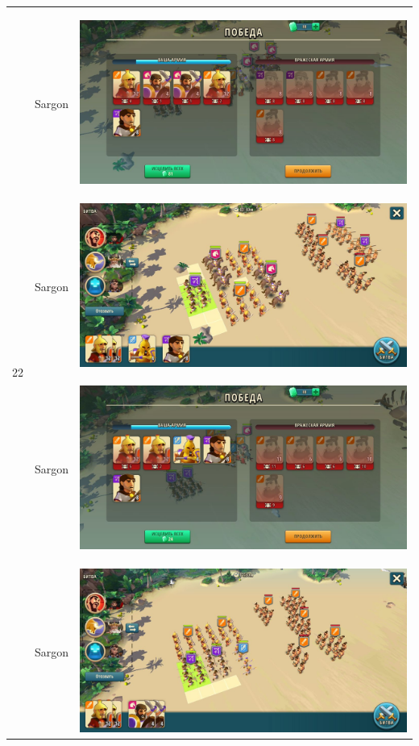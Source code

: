 \begin{longtable}{|c|c|c|}
    \hline
    \multirow{4}{*}{22} & Sargon &
    \hypertarget{fight22}{\includegraphics[width=0.75\linewidth]{./parts/media/TreasureHunt/22/sargon/photo_2022-04-06_18-12-13.jpg}} \\
    & Sargon &
    \includegraphics[width=0.75\linewidth]{./parts/media/TreasureHunt/22/sargon/photo_2022-04-06_18-12-03.jpg} \\
    \hline
    \multirow{2}{*}{23} & Sargon &
    \hypertarget{fight23}{\includegraphics[width=0.75\linewidth]{./parts/media/TreasureHunt/23/sargon/photo_2022-04-06_18-12-26.jpg}} \\
    & Sargon &
    \includegraphics[width=0.75\linewidth]{./parts/media/TreasureHunt/23/sargon/photo_2022-04-06_18-12-18.jpg} \\

\end{longtable}
